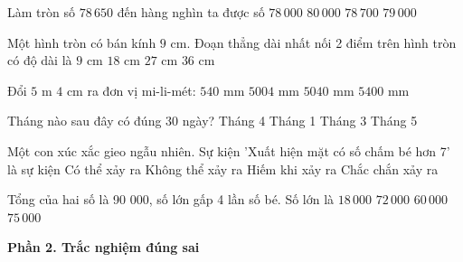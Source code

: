 \begin{ex} %
Làm tròn số $78\,650$ đến hàng nghìn ta được số
\choice
{$78\,000$}
{$80\,000$}
{$78\,700$}
{\True $79\,000$}
\end{ex}

\begin{ex} %
Một hình tròn có bán kính $9\text{ cm}$. Đoạn thẳng dài nhất nối 2 điểm trên hình tròn có độ dài là
\choice
{$9\text{ cm}$}
{\True $18\text{ cm}$}
{$27\text{ cm}$}
{$36\text{ cm}$}
\end{ex}

\begin{ex} %
Đổi $5\text{ m } 4\text{ cm}$ ra đơn vị mi-li-mét:
\choice
{$540\text{ mm}$}
{$5004\text{ mm}$}
{\True $5040\text{ mm}$}
{$5400\text{ mm}$}
\end{ex}

\begin{ex} %
Tháng nào sau đây có đúng 30 ngày?
\choice
{\True Tháng 4}
{Tháng 1}
{Tháng 3}
{Tháng 5}
\end{ex}

\begin{ex} %
Một con xúc xắc gieo ngẫu nhiên. Sự kiện 'Xuất hiện mặt có số chấm bé hơn 7' là sự kiện
\choice
{Có thể xảy ra}
{Không thể xảy ra}
{Hiếm khi xảy ra}
{\True Chắc chắn xảy ra}
\end{ex}

\begin{ex} %
Tổng của hai số là 90 000, số lớn gấp 4 lần số bé. Số lớn là
\choice
{$18\,000$}
{\True $72\,000$}
{$60\,000$}
{$75\,000$}
\end{ex}

\textbf{Phần 2. Trắc nghiệm đúng sai}

